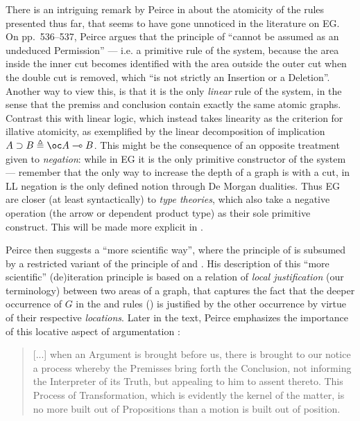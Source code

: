 There is an intriguing remark by Peirce in \cite{peirce_prolegomena_1906} about
the atomicity of the rules presented thus far, that seems to have gone unnoticed
in the literature on EG. On pp.~536--537, Peirce argues that the principle of
 ``cannot be assumed as an undeduced Permission'' --- i.e. a
primitive rule of the system, because the area inside the inner cut becomes
identified with the area outside the outer cut when the double cut is removed,
which ``is not strictly an Insertion or a Deletion''. Another way to view this,
is that it is the only \emph{linear} rule of the system, in the sense that the
premiss and conclusion contain exactly the same atomic graphs. Contrast this
with linear logic, which instead takes linearity as the criterion for illative
atomicity, as exemplified by the linear decomposition of implication $A \limp B
\defeq \oc A \multimap B$. This might be the consequence of an opposite
treatment given to \emph{negation}: while in EG it is the only primitive
constructor of the system --- remember that the only way to increase the depth
of a graph is with a cut, in LL negation is the only defined notion through De
Morgan dualities. Thus EG are closer (at least syntactically) to \emph{type
theories}, which also take a negative operation (the arrow or dependent product
type) as their sole primitive construct. This will be made more explicit in
.

Peirce then suggests a ``more scientific way'', where the principle of
 is subsumed by a restricted variant of the principle of
 and . His description of this ``more
scientific'' (de)iteration principle is based on a relation of \emph{local
justification} (our terminology) between two areas of a graph, that captures the
fact that the deeper occurrence of $G$ in the  and  rules
() is justified by the other occurrence by virtue of their
respective \emph{locations}. Later in the text, Peirce emphasizes the importance
of this locative aspect of argumentation
\cite[pp.~544-545]{peirce_prolegomena_1906}:

\begin{quote}
  [...] when an Argument is brought before us, there is brought to our notice a
process whereby the Premisses bring forth the Conclusion, not informing the
Interpreter of its Truth, but appealing to him to assent thereto. This Process
of Transformation, which is evidently the kernel of the matter, is no more built
out of Propositions than a motion is built out of position.
\end{quote}

